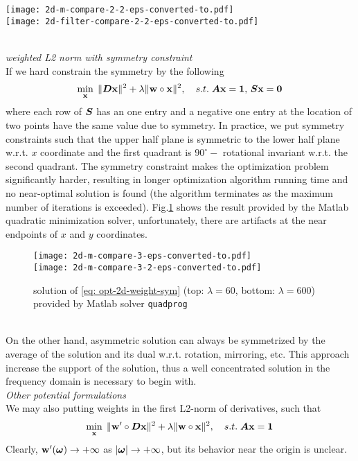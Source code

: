 \vspace*{2em}
\begin{minipage}{.9\textwidth}
\centering
\texttt{[image: 2d-m-compare-2-2-eps-converted-to.pdf]}\\
\texttt{[image: 2d-filter-compare-2-2-eps-converted-to.pdf]}
\label{fig: 2d-compare-2.2}
\end{minipage}
\\[1em]
{\it weighted L2 norm with symmetry constraint}\\
If we hard constrain the symmetry by the following
\begin{align}
\min_{\mathbf{x}}\; \Vert \boldsymbol{D}\mathbf{x}\Vert^2 + \lambda\Vert \mathbf{w}\circ\mathbf{x}\Vert^2,\quad s.t. \; \boldsymbol{A}\mathbf{x} = \mathbf{1},\,\boldsymbol{S}\mathbf{x} = \mathbf{0} \label{eq: opt-2d-weight-sym}
\end{align}
where each row of $\boldsymbol{S}$ has an one entry and a negative one entry at the location of two points have the same value due to symmetry. In practice, we put symmetry constraints such that the upper half plane is symmetric to the lower half plane w.r.t. $x$ coordinate and the first quadrant is $90^{\circ}-$ rotational invariant w.r.t. the second quadrant. The symmetry constraint makes the optimization problem significantly harder, resulting in longer optimization algorithm running time and no near-optimal solution is found (the algorithm terminates as the maximum number of iterations is exceeded). Fig.\ref{fig: 2d-compare-3} shows the result provided by the Matlab quadratic minimization solver, unfortunately, there are artifacts at the near endpoints of $x$ and $y$ coordinates.
\begin{figure}[h]
\texttt{[image: 2d-m-compare-3-eps-converted-to.pdf]}\\
\texttt{[image: 2d-m-compare-3-2-eps-converted-to.pdf]}
\caption{solution of \eqref{eq: opt-2d-weight-sym} (top: $\lambda=60$, bottom: $\lambda=600$) provided by Matlab solver \texttt{quadprog}}
\label{fig: 2d-compare-3}
\end{figure}
\\
On the other hand, asymmetric solution can always be symmetrized by the average of the solution and its dual
w.r.t. rotation, mirroring, etc. This approach increase the support of the solution, thus a well concentrated solution in the frequency domain is necessary to begin with.
\\[1em]
{\it Other potential formulations}\\
We may also putting weights in the first L2-norm of derivatives, such that
\begin{align}
\min_{\mathbf{x}}\; \Vert \mathbf{w}'\circ \boldsymbol{D}\mathbf{x}\Vert^2 + \lambda\Vert \mathbf{w}\circ\mathbf{x}\Vert^2,\quad s.t. \; \boldsymbol{A}\mathbf{x} = \mathbf{1} \label{eq: opt-2d-double-weight}
\end{align}
Clearly, $\mathbf{w}'(\boldsymbol{\omega})\rightarrow +\infty$ as $|\boldsymbol{\omega}|\rightarrow +\infty$, but its behavior near the origin is unclear.
